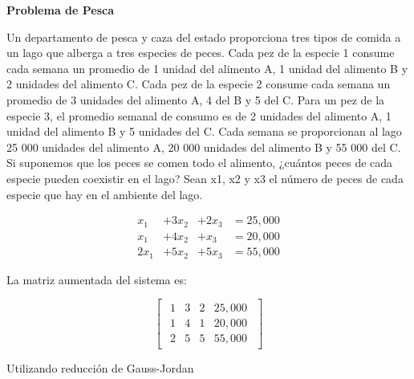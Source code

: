 \documentclass{article}
\begin{document}
\begin{large}
    \textbf{Problema de Pesca}
\end{large}

Un departamento de pesca y caza del estado proporciona tres tipos de comida a un lago que alberga a tres especies de peces. Cada pez de la especie 1 consume cada semana un promedio de 1 unidad del alimento A, 1 unidad del alimento B y 2 unidades del alimento C. Cada pez de la especie 2 consume cada semana un promedio de 3 unidades del alimento A, 4 del B y 5 del C. Para un pez de la especie 3, el promedio semanal de consumo es de 2 unidades del alimento A, 1 unidad del alimento B y 5 unidades del C. Cada semana se proporcionan al lago 25 000 unidades del alimento A, 20 000 unidades del alimento B y 55 000 del C. Si suponemos que los peces se comen todo el alimento, ¿cuántos peces de cada especie pueden coexistir en el lago? Sean x1, x2 y x3 el número de peces de cada especie que hay en el ambiente del lago.

\begin{equation*}
    \begin{aligned}
        x_1 &+ 3x_2 &+ 2x_3 &= 25,000\\
        x_1 &+ 4x_2 &+ x_3 &= 20,000\\
        2x_1 &+ 5x_2 &+ 5x_3 &= 55,000
    \end{aligned}
\end{equation*}

La matriz aumentada del sistema es:

\begin{equation*}
    \begin{bmatrix}
        \begin{array}{rrr|r}
            1 & 3 & 2 & 25,000\\
            1 & 4 & 1 & 20,000 \\
            2 & 5 & 5 & 55,000
        \end{array}
    \end{bmatrix}
\end{equation*}

Utilizando reducción de Gauss-Jordan
\end{document}
